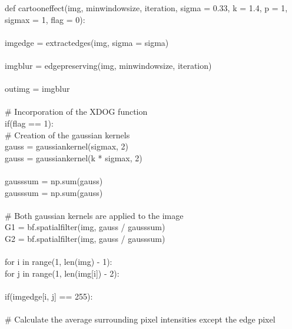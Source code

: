 \documentclass{article}
\begin{document}
	\noindent def cartoon\textunderscore effect(img, min\textunderscore window\textunderscore size, iteration, sigma = 0.33, k = 1.4, p = 1, sigma\textunderscore x = 1, flag = 0):\\
	\\
	\indent img\textunderscore edge = extract\textunderscore edges(img, sigma = sigma)\\
	\\
	\indent img\textunderscore blur = edge\textunderscore preserving(img, min\textunderscore window\textunderscore size, iteration)\\
	\\
	\indent out\textunderscore img = img\textunderscore blur\\
	\\
	\indent \# Incorporation of the XDOG function\\
	\indent if(flag == 1):\\
	\indent \indent \#       Creation of the gaussian kernels\\
	\indent \indent gauss = gaussian\textunderscore kernel(sigma\textunderscore x, 2)\\
	\indent \indent gauss = gaussian\textunderscore kernel(k * sigma\textunderscore x, 2)\\
	\\
	\indent \indent gauss\textunderscore sum = np.sum(gauss)\\
	\indent \indent gauss\textunderscore sum = np.sum(gauss)\\
	\\
	\indent \indent \# Both gaussian kernels are applied to the image\\
	\indent \indent G1 = bf.spatial\textunderscore filter(img, gauss / gauss\textunderscore sum)\\
	\indent \indent G2 = bf.spatial\textunderscore filter(img, gauss / gauss\textunderscore sum)\\
	\\
	\indent for i in range(1, len(img) - 1):\\
	\indent \indent for j in range(1, len(img[i]) - 2):\\
	\\
	\indent \indent \indent if(img\textunderscore edge[i, j] == 255):\\
	\\
	\indent \indent \indent \indent \# Calculate the average surrounding pixel intensities except the edge pixel\\
\end{document}
